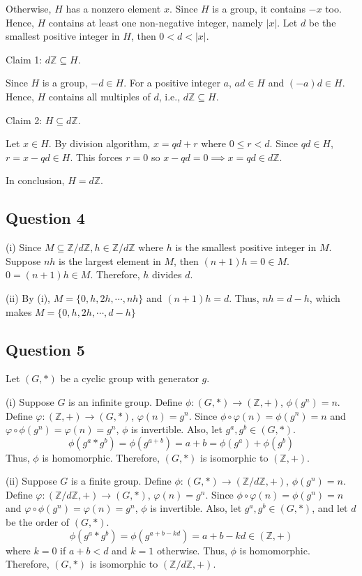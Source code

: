\documentclass{article}
\begin{document}
Otherwise, $H$ has a nonzero element $x$. Since $H$ is a group, it contains $-x$ too. Hence, $H$ contains at least one non-negative integer, namely $|x|$. Let $d$ be the smallest positive integer in $H$, then $0<d<|x|$.

Claim 1: $d\mathbb{Z}\subseteq H$.

Since $H$ is a group, $-d\in H$. For a positive integer $a$, $ad\in H$ and $(-a)d\in H$. Hence, $H$ contains all multiples of $d$, i.e., $d\mathbb{Z}\subseteq H$.

Claim 2: $H\subseteq d\mathbb{Z}$.

Let $x\in H$. By division algorithm, $x = qd+r$ where $0\leq r<d$. Since $qd\in H$, $r = x-qd\in H$. This forces $r = 0$ so $x-qd = 0 \implies x=qd\in d\mathbb{Z}$. 

In conclusion, $H = d\mathbb{Z}$.

\subsection*{Question 4}
(i) Since $M\subseteq\mathbb{Z}/d\mathbb{Z}, h\in\mathbb{Z}/d\mathbb{Z}$ where $h$ is the smallest positive integer in $M$. Suppose $nh$ is the largest element in $M$, then $(n+1)h = 0\in M$. $0=(n+1)h\in M$. Therefore, $h$ divides $d$.

(ii) By (i), $M = \{0,h,2h,\cdots,nh\}$ and $(n+1)h = d$. Thus, $nh = d-h$, which makes  $M = \{0,h,2h,\cdots,d-h\}$

\subsection*{Question 5}
Let $(G,*)$ be a cyclic group with generator $g$.

(i) Suppose $G$ is an infinite group. Define $\phi:(G,*)\rightarrow(\mathbb{Z},+)$, $\phi(g^n)=n$. Define $\varphi:(\mathbb{Z},+)\rightarrow(G,*)$, $\varphi(n) = g^n$. Since $\phi\circ\varphi(n)=\phi(g^n)=n$ and $\varphi\circ\phi(g^n) =\varphi(n)=g^n$, $\phi$ is invertible. Also, let $g^a, g^b\in(G,*)$. \[ \phi(g^a*g^b)=\phi(g^{a+b}) = a+b = \phi(g^a)+\phi(g^b)\]
Thus, $\phi$ is homomorphic. Therefore, $(G,*)$ is isomorphic to $(\mathbb{Z},+)$.

(ii) Suppose $G$ is a finite group. Define $\phi:(G,*)\rightarrow(\mathbb{Z}/d\mathbb{Z},+)$, $\phi(g^n)=n$. Define $\varphi:(\mathbb{Z}/d\mathbb{Z},+)\rightarrow(G,*)$, $\varphi(n) = g^n$. Since $\phi\circ\varphi(n)=\phi(g^n)=n$ and $\varphi\circ\phi(g^n) =\varphi(n)=g^n$, $\phi$ is invertible. Also, let $g^a, g^b\in(G,*)$, and let $d$ be the order of $(G,*)$.
\[ \phi(g^a*g^b)=\phi(g^{a+b-kd}) = a+b -kd\in(\mathbb{Z},+)\]
where $k = 0$ if $a+b<d$ and $k=1$ otherwise. Thus, $\phi$ is homomorphic. Therefore, $(G,*)$ is isomorphic to $(\mathbb{Z}/d\mathbb{Z},+)$.
\end{document}
